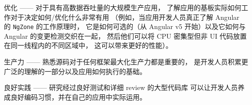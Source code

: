 优化 —— 对于具有高数据吞吐量的大规模生产应用，
了解应用的基板实际如何工作对于决定如何/优化什么非常有用
（例如，当应用开发人员真正了解 Angular 的 \texttt{NgZone} 的工作原理时，
它是如何可选的（从 Angular v5 开始）以及它如何与 Angular 的变更检测交织在一起，
然后他们可以将 CPU 密集型但非 UI 代码放置在同一线程内的不同区域中，
这可以带来更好的性能）。


生产力 —— 熟悉源码对于任何框架最大化生产力都是重要的，
是开发人员积累更广泛的理解的一部分以及应用如何执行的基础。


良好实践 —— 研究经过良好测试和详细 review 的大型代码库
可以让开发人员养成良好编码习惯，并在自己的应用中实际运用。